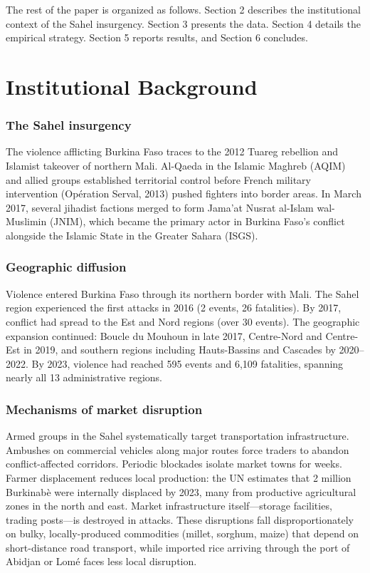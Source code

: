 \documentclass[12pt]{article}
\begin{document}
The rest of the paper is organized as follows. Section 2 describes the institutional context of the Sahel insurgency. Section 3 presents the data. Section 4 details the empirical strategy. Section 5 reports results, and Section 6 concludes.


\section{Institutional Background}

\subsubsection*{The Sahel insurgency} The violence afflicting Burkina Faso traces to the 2012 Tuareg rebellion and Islamist takeover of northern Mali. Al-Qaeda in the Islamic Maghreb (AQIM) and allied groups established territorial control before French military intervention (Op\'{e}ration Serval, 2013) pushed fighters into border areas. In March 2017, several jihadist factions merged to form Jama'at Nusrat al-Islam wal-Muslimin (JNIM), which became the primary actor in Burkina Faso's conflict alongside the Islamic State in the Greater Sahara (ISGS).

\subsubsection*{Geographic diffusion} Violence entered Burkina Faso through its northern border with Mali. The Sahel region experienced the first attacks in 2016 (2 events, 26 fatalities). By 2017, conflict had spread to the Est and Nord regions (over 30 events). The geographic expansion continued: Boucle du Mouhoun in late 2017, Centre-Nord and Centre-Est in 2019, and southern regions including Hauts-Bassins and Cascades by 2020--2022. By 2023, violence had reached 595 events and 6,109 fatalities, spanning nearly all 13 administrative regions.

\subsubsection*{Mechanisms of market disruption} Armed groups in the Sahel systematically target transportation infrastructure. Ambushes on commercial vehicles along major routes force traders to abandon conflict-affected corridors. Periodic blockades isolate market towns for weeks. Farmer displacement reduces local production: the UN estimates that 2 million Burkinab\`{e} were internally displaced by 2023, many from productive agricultural zones in the north and east. Market infrastructure itself---storage facilities, trading posts---is destroyed in attacks. These disruptions fall disproportionately on bulky, locally-produced commodities (millet, sorghum, maize) that depend on short-distance road transport, while imported rice arriving through the port of Abidjan or Lom\'{e} faces less local disruption.
\end{document}
